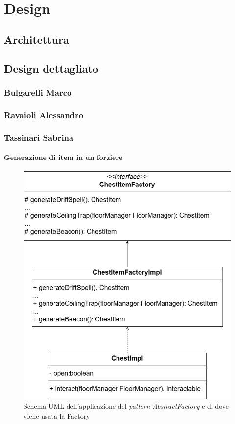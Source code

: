 \documentclass{report}
\begin{document}
\chapter{Design}

\section{Architettura}

\section{Design dettagliato}

\subsection{Bulgarelli Marco}

\subsection{Ravaioli Alessandro}

\subsection{Tassinari Sabrina}

\subsubsection{Generazione di item in un forziere}

\begin{figure}
    \centering
    \includegraphics[width=12cm]{chestItemFactory.drawio.png}
    \caption{Schema UML dell'applicazione del \textit{pattern AbstractFactory} e di dove viene usata la Factory}
    \label{img:chestItemFactory}
\end{figure}
\end{document}

